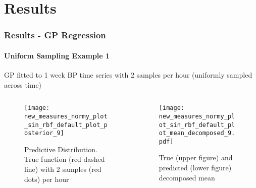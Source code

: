 \documentclass[
	8pt, %
]{beamer}
\begin{document}
%
%
%
%



\section{Results}

\begin{frame}
	\frametitle{Results - GP Regression}
	\framesubtitle{Uniform Sampling Example 1}

	GP fitted to 1 week BP time series with 2 samples per hour (uniformly sampled across time)

	\begin{columns}[c] %
		\begin{column}{0.5\textwidth} %
				\begin{figure}
					\texttt{[image: new\_measures\_normy\_plot\_sin\_rbf\_default\_plot\_posterior\_9]}
					\caption{Predictive Distribution. True function (red dashed line) with 2 samples (red dots) per hour}
				\end{figure}
		\end{column}
		\begin{column}{0.5\textwidth} %
				\begin{figure}
					\texttt{[image: new\_measures\_normy\_plot\_sin\_rbf\_default\_plot\_mean\_decomposed\_9.pdf]}
					\caption{True (upper figure) and predicted (lower figure) decomposed mean}
				\end{figure}

		\end{column}
	\end{columns}

\end{frame}
\end{document}
